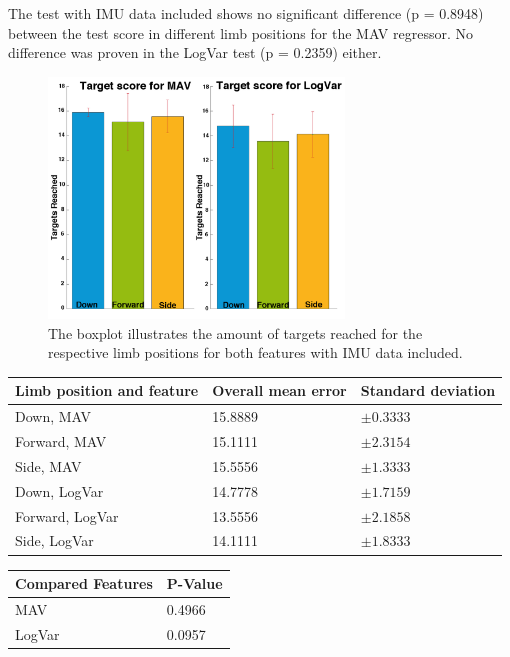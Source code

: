 The test with IMU data included shows no significant difference (p = 0.8948) between the test score in different limb positions for the MAV regressor. No difference was proven in the LogVar test (p = 0.2359) either.

\begin{figure}[H]
	\includegraphics[width=0.7\textwidth]{figures/results/TargetsReachedIMU}  %
	\caption{The boxplot illustrates the amount of targets reached for the respective limb positions for both features with IMU data included.}
	\label{fig:TargetsReachedIMU}  %
\end{figure}

	\begin{center}
		\begin{tabular}{l l l}
			\toprule
			\textbf{Limb position and feature} & \textbf{Overall mean error} & \textbf{Standard deviation}\\
			\midrule
			Down, MAV & 15.8889 & $\pm 0.3333$ \\
			Forward, MAV & 15.1111 & $\pm 2.3154$ \\
			Side, MAV & 15.5556 & $\pm 1.3333$ \\
			Down, LogVar & 14.7778 & $\pm 1.7159$ \\
			Forward, LogVar & 13.5556 & $\pm 2.1858$ \\
			Side, LogVar & 14.1111 & $\pm 1.8333$ \\
			\bottomrule
		\end{tabular}
	\end{center}
	
	\begin{center}
		\begin{tabular}{l l}
			\toprule
			\textbf{Compared Features} & \textbf{P-Value}\\
			\midrule
			MAV & 0.4966 \\
			LogVar & 0.0957 \\
			\bottomrule
		\end{tabular}
	\end{center}
	
